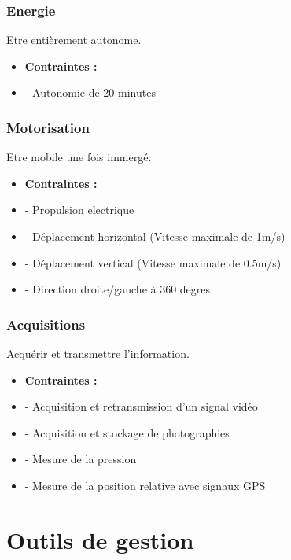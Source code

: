 \documentclass[a4paper,11pt]{report}
\begin{document}
						\subsection{Energie}
								Etre entièrement autonome. \newline
								\begin{itemize}
										\item \textbf{Contraintes :}
										\item - Autonomie de 20 minutes
								\end{itemize}

						\subsection{Motorisation}
								Etre mobile une fois immergé. \newline
								\begin{itemize}
										\item \textbf{Contraintes :}
										\item - Propulsion electrique
										\item - Déplacement horizontal (Vitesse maximale de 1m/s)
										\item - Déplacement vertical (Vitesse maximale de 0.5m/s)
										\item - Direction droite/gauche à 360 degres   \newline \newline
								\end{itemize}

						\subsection{Acquisitions}
								Acquérir et transmettre l'information. \newline
								\begin{itemize}
										\item \textbf{Contraintes :}
										\item - Acquisition et retransmission d'un signal vidéo
										\item - Acquisition et stockage de photographies
										\item - Mesure de la pression
										\item - Mesure de la position relative avec signaux GPS
								\end{itemize}
								
\chapter{Outils de gestion}
\end{document}
